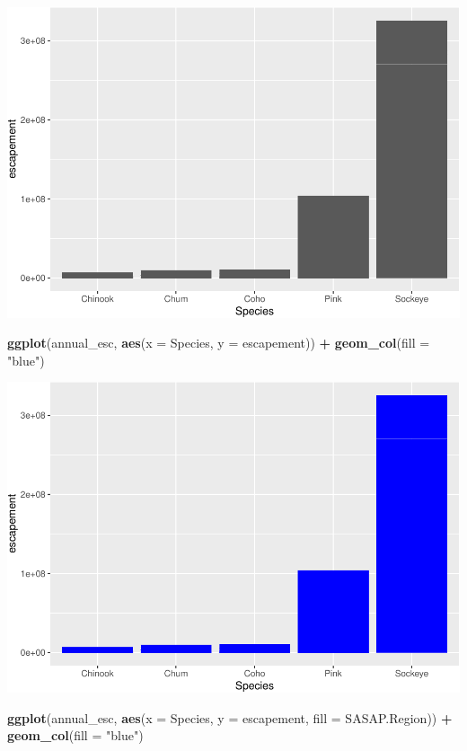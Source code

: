 \documentclass[]{article}
\newenvironment{Shaded}{\begin{snugshade}}{\end{snugshade}}
\newcommand{\DataTypeTok}[1]{\textcolor[rgb]{0.13,0.29,0.53}{#1}}
\newcommand{\KeywordTok}[1]{\textcolor[rgb]{0.13,0.29,0.53}{\textbf{#1}}}
\newcommand{\NormalTok}[1]{#1}
\newcommand{\OperatorTok}[1]{\textcolor[rgb]{0.81,0.36,0.00}{\textbf{#1}}}
\newcommand{\StringTok}[1]{\textcolor[rgb]{0.31,0.60,0.02}{#1}}
\begin{document}
\includegraphics{Rmarkdown_files/figure-latex/unnamed-chunk-4-1.pdf}

\begin{Shaded}
\begin{Highlighting}[]
\KeywordTok{ggplot}\NormalTok{(annual_esc, }\KeywordTok{aes}\NormalTok{(}\DataTypeTok{x =}\NormalTok{ Species, }\DataTypeTok{y =}\NormalTok{ escapement)) }\OperatorTok{+}
\StringTok{  }\KeywordTok{geom_col}\NormalTok{(}\DataTypeTok{fill =} \StringTok{"blue"}\NormalTok{)}
\end{Highlighting}
\end{Shaded}

\includegraphics{Rmarkdown_files/figure-latex/unnamed-chunk-5-1.pdf}

\begin{Shaded}
\begin{Highlighting}[]
\KeywordTok{ggplot}\NormalTok{(annual_esc, }\KeywordTok{aes}\NormalTok{(}\DataTypeTok{x =}\NormalTok{ Species, }\DataTypeTok{y =}\NormalTok{ escapement, }\DataTypeTok{fill =}\NormalTok{ SASAP.Region)) }\OperatorTok{+}
\StringTok{  }\KeywordTok{geom_col}\NormalTok{(}\DataTypeTok{fill =} \StringTok{"blue"}\NormalTok{)}
\end{Highlighting}
\end{Shaded}
\end{document}
